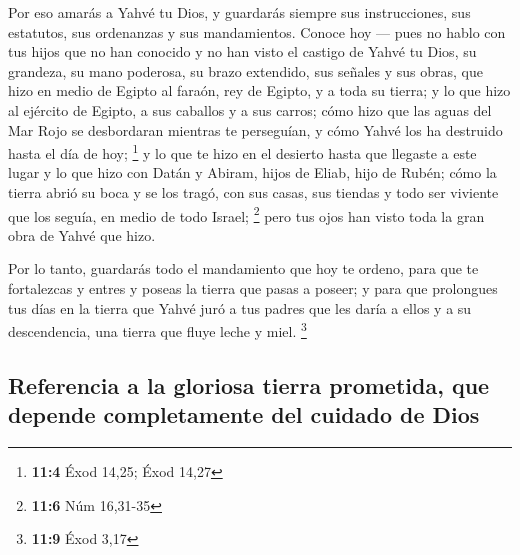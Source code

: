 \begin{paracol}{2}
 Por eso amarás a Yahvé tu Dios, y guardarás siempre sus
instrucciones, sus estatutos, sus ordenanzas y sus mandamientos.
 Conoce hoy --- pues no hablo con tus hijos que no han
conocido y no han visto el castigo de Yahvé tu Dios, su grandeza, su
mano poderosa, su brazo extendido,  sus señales y sus
obras, que hizo en medio de Egipto al faraón, rey de Egipto, y a toda su
tierra;  y lo que hizo al ejército de Egipto, a sus
caballos y a sus carros; cómo hizo que las aguas del Mar Rojo se
desbordaran mientras te perseguían, y cómo Yahvé los ha destruido hasta
el día de hoy; \footnote{\textbf{11:4} Éxod 14,25; Éxod 14,27}
 y lo que te hizo en el desierto hasta que llegaste a este
lugar  y lo que hizo con Datán y Abiram, hijos de Eliab,
hijo de Rubén; cómo la tierra abrió su boca y se los tragó, con sus
casas, sus tiendas y todo ser viviente que los seguía, en medio de todo
Israel; \footnote{\textbf{11:6} Núm 16,31-35}  pero tus
ojos han visto toda la gran obra de Yahvé que hizo.

 Por lo tanto, guardarás todo el mandamiento que hoy te
ordeno, para que te fortalezcas y entres y poseas la tierra que pasas a
poseer;  y para que prolongues tus días en la tierra que
Yahvé juró a tus padres que les daría a ellos y a su descendencia, una
tierra que fluye leche y miel. \footnote{\textbf{11:9} Éxod 3,17}

\hypertarget{referencia-a-la-gloriosa-tierra-prometida-que-depende-completamente-del-cuidado-de-dios}{%
\subsection{Referencia a la gloriosa tierra prometida, que depende
completamente del cuidado de
Dios}\label{referencia-a-la-gloriosa-tierra-prometida-que-depende-completamente-del-cuidado-de-dios}}


\end{paracol}
